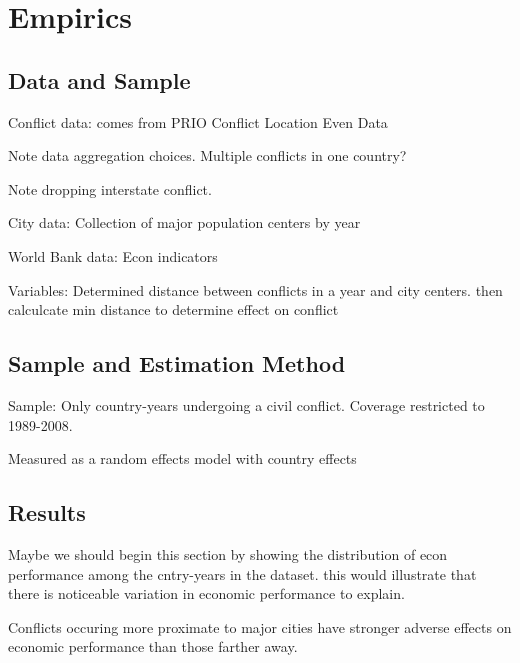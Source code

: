 \section{Empirics}
\label{empirics}

\subsection{Data and Sample}

Conflict data: comes from PRIO Conflict Location Even Data 

	Note data aggregation choices.  Multiple conflicts in one country?

	Note dropping interstate conflict.

City data: Collection of major population centers by year 

World Bank data: Econ indicators 

Variables: Determined distance between conflicts in a year and city centers. then calculcate min distance to determine effect on conflict 

\subsection{Sample and Estimation Method}

Sample: Only country-years undergoing a civil conflict. Coverage restricted to 1989-2008. 

Measured as a random effects model with country effects 

\subsection{Results}

Maybe we should begin this section by showing the distribution of econ performance among the cntry-years in the dataset. this would illustrate that there is noticeable variation in economic performance to explain. 

Conflicts occuring more proximate to major cities have stronger adverse effects on economic performance than those farther away. 